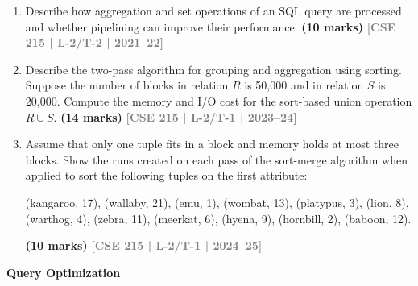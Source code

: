 \documentclass[12pt,a3paper]{article}
\newcommand{\yr}[1]{\hfill\textcolor{gray}{\small\textbf{[#1]}}}
\newcommand{\mk}[1]{\textcolor{orange!70!black}{\small\textbf{(#1 marks)}}}
\newcommand{\subtopic}[2]{%
  \vspace{10pt}
  \noindent\begin{tcolorbox}[colback=#1!8,colframe=#1,boxrule=0.6pt,arc=4pt,
    left=6pt,right=6pt,top=4pt,bottom=4pt]
    \small\bfseries\textcolor{#1}{#2}
  \end{tcolorbox}
  \vspace{2pt}
}
\begin{document}
\begin{enumerate}
\item Describe how aggregation and set operations of an SQL query are processed and whether pipelining can improve their performance.
\mk{10} \yr{CSE 215 | L-2/T-2 | 2021--22}

\item Describe the two-pass algorithm for grouping and aggregation using sorting. Suppose the number of blocks in relation $R$ is 50,000 and in relation $S$ is 20,000. Compute the memory and I/O cost for the sort-based union operation $R \cup S$.
\mk{14} \yr{CSE 215 | L-2/T-1 | 2023--24}

\item Assume that only one tuple fits in a block and memory holds at most three blocks. Show the runs created on each pass of the sort-merge algorithm when applied to sort the following tuples on the first attribute:
\begin{center}
(kangaroo, 17), (wallaby, 21), (emu, 1), (wombat, 13), (platypus, 3), (lion, 8),\\ (warthog, 4), (zebra, 11), (meerkat, 6), (hyena, 9), (hornbill, 2), (baboon, 12).
\end{center}
\mk{10} \yr{CSE 215 | L-2/T-1 | 2024--25}

\end{enumerate}

\subtopic{cD}{Query Optimization}
\label{sub:s6-qo}
\end{document}
